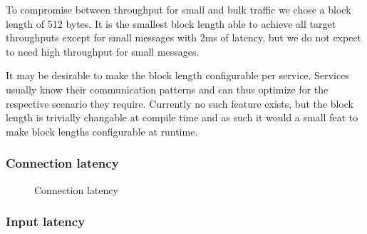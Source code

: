 To compromise between throughput for small and bulk traffic we chose a block length of 512 bytes.
It is the smallest block length able to achieve all target throughputs except for small messages with 2ms of latency, but we do not expect to need high throughput for small messages.

It may be desirable to make the block length configurable per service.
Services usually know their communication patterns and can thus optimize for the respective scenario they require.
Currently no such feature exists, but the block length is trivially changable at compile time and as such it would a small feat to make block lengths configurable at runtime.

\subsubsection{Connection latency}

\begin{figure}[h]
    \centering
    \caption{Connection latency}
\end{figure}

\subsubsection{Input latency}

